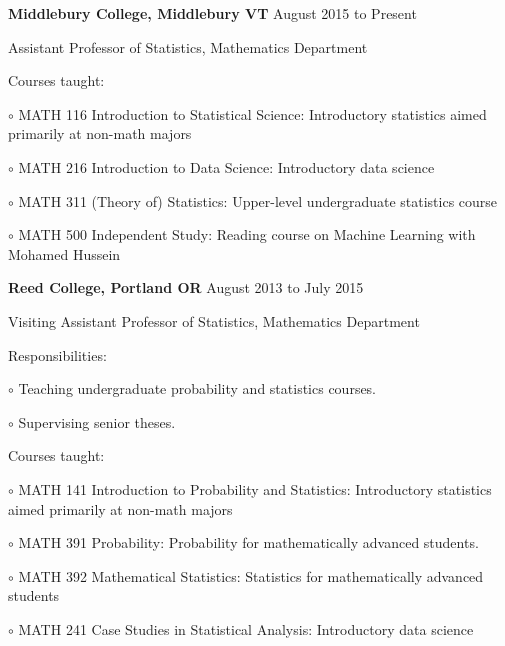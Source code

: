 \documentclass[10pt]{article}
\newcommand{\halfblankline}{\quad\vspace{-0.5\baselineskip}\pagebreak[3]}
\begin{document}
\textbf{Middlebury College, Middlebury VT} \hfill {August 2015 to Present}
\begin{outerlist}
    \item[] Assistant Professor of Statistics, Mathematics Department 
    	\begin{innerlist}
		\item Courses taught:
		\begin{innerlist}
		\item[$\circ$] MATH 116 Introduction to Statistical Science:  Introductory 
		statistics aimed primarily at non-math majors
		\item[$\circ$] MATH 216 Introduction to Data Science: Introductory data science
		\item[$\circ$] MATH 311 (Theory of) Statistics: Upper-level undergraduate
		statistics course 
		\item[$\circ$] MATH 500 Independent Study: Reading course on Machine Learning 
		with Mohamed Hussein
		\end{innerlist}
	\end{innerlist}
\end{outerlist}

\halfblankline

\textbf{Reed College, Portland OR} \hfill {August 2013 to July 2015}
\begin{outerlist}
    \item[] Visiting Assistant Professor of Statistics, Mathematics Department
    \begin{innerlist}
        \item Responsibilities: 
		\begin{innerlist}
		\item[$\circ$] Teaching undergraduate probability and statistics courses.
		\item[$\circ$] Supervising senior theses.
		\end{innerlist}
		\item Courses taught:
		\begin{innerlist}
		\item[$\circ$] MATH 141 Introduction to Probability and Statistics:  Introductory 
		statistics aimed primarily at non-math majors
		\item[$\circ$] MATH 391 Probability: Probability for mathematically 
		advanced students.
		\item[$\circ$] MATH 392 Mathematical Statistics: Statistics for mathematically
		 advanced students
		\item[$\circ$] MATH 241 Case Studies in Statistical Analysis:  Introductory 
		data science
	\end{innerlist}
    \end{innerlist}
\end{outerlist}
\end{document}
